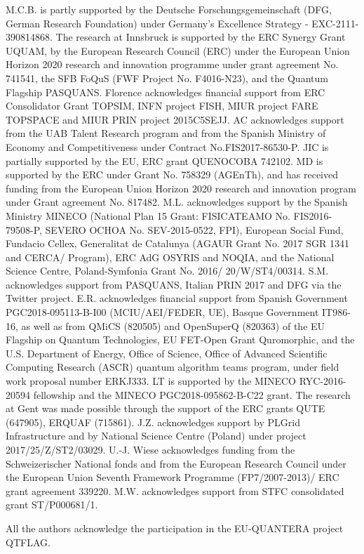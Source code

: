 \documentclass[epj,final]{svjour}
\begin{document}
M.C.B. is partly supported by the Deutsche Forschungsgemeinschaft (DFG, German Research Foundation) under Germany's Excellence Strategy - EXC-2111- 390814868. The research at Innsbruck is supported by the ERC Synergy Grant UQUAM, by the European Research Council (ERC) under the European Union Horizon 2020 research and innovation programme under grant agreement No. 741541, the SFB FoQuS (FWF Project No.  F4016-N23), and the Quantum Flagship PASQUANS. Florence acknowledges financial support from ERC Consolidator Grant TOPSIM, INFN project FISH, MIUR project FARE TOPSPACE and MIUR PRIN project 2015C5SEJJ. AC acknowledges support from the UAB Talent Research program and from the Spanish Ministry of Economy and Competitiveness under Contract No.FIS2017-86530-P.  JIC is partially supported by the EU, ERC grant QUENOCOBA 742102. MD is supported by the ERC under Grant No. 758329 (AGEnTh), and has received funding from the European Union Horizon 2020 research and innovation program under Grant agreement No. 817482. M.L. acknowledges support by the Spanish Ministry  MINECO  (National Plan 15 Grant: FISICATEAMO No. FIS2016-79508-P, SEVERO OCHOA No.  SEV-2015-0522, FPI), European Social Fund, Fundacio Cellex, Generalitat de Catalunya (AGAUR Grant No. 2017 SGR 1341 and CERCA/ Program), ERC AdG OSYRIS and NOQIA, and the National Science Centre, Poland-Symfonia Grant No. 2016/ 20/W/ST4/00314. S.M. acknowledges support from PASQUANS, Italian PRIN 2017 and DFG via the Twitter project. E.R. acknowledges financial support from Spanish Government PGC2018-095113-B-I00 (MCIU/AEI/FEDER, UE), Basque Government IT986-16, as well as from QMiCS (820505) and OpenSuperQ (820363) of the EU Flagship on Quantum Technologies, EU FET-Open Grant Quromorphic, and the U.S. Department of Energy, Office of Science, Office of Advanced Scientific Computing Research (ASCR) quantum algorithm teams program, under field work proposal number ERKJ333. LT is supported by the MINECO RYC-2016-20594 fellowship and the MINECO PGC2018-095862-B-C22 grant. The research at Gent was made possible through the support of the ERC grants QUTE (647905), ERQUAF (715861). J.Z. acknowledges support by PLGrid Infrastructure and by National Science Centre (Poland) under project 2017/25/Z/ST2/03029. U.-J. Wiese acknowledges funding from the Schweizerischer National fonds and from the European Research Council under the European Union Seventh Framework Programme (FP7/2007-2013)/ ERC grant agreement 339220. M.W. acknowledges support from STFC consolidated grant ST/P000681/1.     

All the authors acknowledge the participation in the EU-QUANTERA project QTFLAG.
\end{document}
